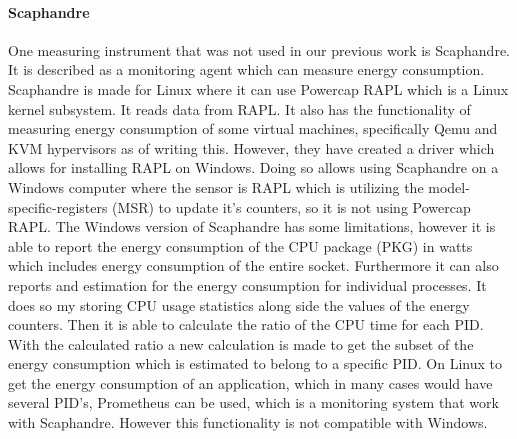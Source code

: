 \paragraph{Scaphandre}
One measuring instrument that was not used in our previous work is Scaphandre\cite{scaphandre}. It is described as a monitoring agent which can measure energy consumption. Scaphandre is made for Linux where it can use Powercap RAPL which is a Linux kernel subsystem. It reads data from RAPL. It also has the functionality of measuring energy consumption of some virtual machines, specifically Qemu and KVM hypervisors as of writing this. However, they have created a driver which allows for installing RAPL on Windows. Doing so allows using Scaphandre on a Windows computer where the sensor is RAPL which is utilizing the model-specific-registers (MSR) to update it's counters, so it is not using Powercap RAPL. The Windows version of Scaphandre has some limitations, however it is able to report the energy consumption of the CPU package (PKG) in watts which includes energy consumption of the entire socket. Furthermore it can also reports and estimation for the energy consumption for individual processes. It does so my storing CPU usage statistics along side the values of the energy counters. Then it is able to calculate the ratio of the CPU time for each PID. With the calculated ratio a new calculation is made to get the subset of the energy consumption which is estimated to belong to a specific PID.  On Linux to get the energy consumption of an application, which in many cases would have several PID's, Prometheus can be used, which is a monitoring system that work with Scaphandre. However this functionality is not compatible with Windows.